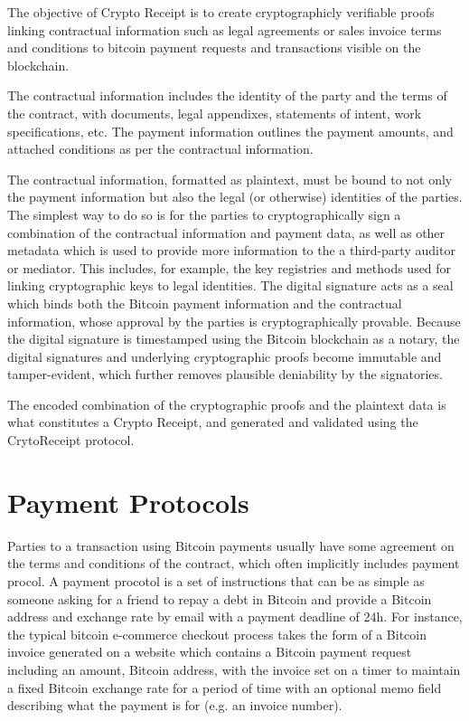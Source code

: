 The objective of Crypto Receipt is to create cryptographicly verifiable proofs linking contractual information such as legal agreements or sales invoice terms and conditions to bitcoin payment requests and transactions visible on the blockchain. 

The contractual information includes the identity of the party and the terms of the contract, with documents, legal appendixes, statements of intent, work specifications, etc. The payment information outlines the payment amounts, and attached conditions as per the contractual information.

The contractual information, formatted as plaintext, must be bound to not only the payment information but also the legal (or otherwise) identities of the parties. The simplest way to do so is for the parties to cryptographically sign a combination of the contractual information and payment data, as well as other metadata which is used to provide more information to the a third-party auditor or mediator. This includes, for example, the key registries and methods used for linking cryptographic keys to legal identities. The digital signature acts as a seal which binds both the Bitcoin payment information and the contractual information, whose approval by the parties is cryptographically provable. Because the digital signature is timestamped using the Bitcoin blockchain as a notary, the digital signatures and underlying cryptographic proofs become immutable and tamper-evident, which further removes plausible deniability by the signatories.

The encoded combination of the cryptographic proofs and the plaintext data is what constitutes a Crypto Receipt, and generated and validated using the CrytoReceipt protocol.


\section{Payment Protocols}

Parties to a transaction using Bitcoin payments usually have some agreement on the terms and conditions of the contract, which often implicitly includes payment procol. A payment procotol is a set of instructions that can be as simple as someone asking for a friend to repay a debt in Bitcoin and provide a Bitcoin address and exchange rate by email with a payment deadline of 24h. For instance, the typical bitcoin e-commerce checkout process takes the form of a Bitcoin invoice generated on a website which contains a Bitcoin payment request including an amount, Bitcoin address, with the invoice set on a timer to maintain a fixed Bitcoin exchange rate for a period of time with an optional memo field describing what the payment is for (e.g. an invoice number).

